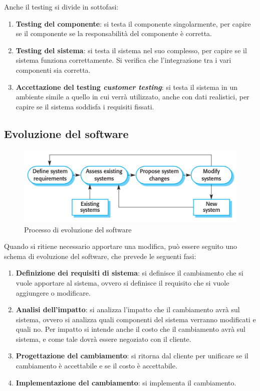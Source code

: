 Anche il testing si divide in sottofasi:
\begin{enumerate}
    \item \textbf{Testing del componente}: si testa il componente singolarmente,
    per capire se il componente se la responsabilità del componente è corretta.
    \item \textbf{Testing del sistema}: si testa il sistema nel suo complesso,
    per capire se il sistema funziona correttamente. Si verifica che l'integrazione 
    tra i vari componenti sia corretta.
    \item \textbf{Accettazione del testing \textit{customer testing}}: si testa il sistema
    in un ambiente simile a quello in cui verrà utilizzato, anche con 
    dati realistici, per capire se il sistema
    soddisfa i requisiti fissati.
\end{enumerate}
\subsection{Evoluzione del software}
\begin{figure}[H]
    \centering
    \includegraphics[scale=0.5]{img/evolution.png}
    \caption{Processo di evoluzione del software}
\end{figure}
Quando si ritiene necessario apportare una modifica, può essere seguito uno schema
di evoluzione del software, che prevede le seguenti fasi:
\begin{enumerate}
    \item \textbf{Definizione dei requisiti di sistema}: si definisce il cambiamento che si vuole
    apportare al sistema, ovvero si definisce il requisito che si vuole aggiungere o
    modificare.
    \item \textbf{Analisi dell'impatto}: si analizza l'impatto che il cambiamento avrà
    sul sistema, ovvero si analizza quali componenti del sistema verranno modificati
    e quali no. Per impatto si intende anche il costo che il cambiamento avrà sul sistema,
    e come tale dovrà essere negoziato con il cliente.
    \item \textbf{Progettazione del cambiamento}: si ritorna dal cliente per unificare 
    se il cambiamento è accettabile e se il costo è accettabile. 
    \item \textbf{Implementazione del cambiamento}: si implementa il cambiamento.
\end{enumerate}


